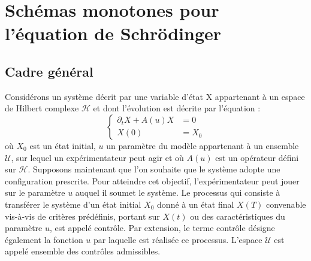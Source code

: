 \chapter{Schémas monotones pour l'équation de Schrödinger}

\section{Cadre général}
Considérons un système décrit par une variable d’état X appartenant à un espace de Hilbert complexe $\mathcal{H}$ et dont l’évolution est décrite par l'équation :
\begin{equation} \label{cadregeneral}
\begin{cases}
\partial_{t}X +A(u)X &= 0\\
X(0) &=X_0
\end{cases}
\end{equation}
où $X_0$ est un état initial, $u$ un paramètre du modèle appartenant à un ensemble $\mathcal{U}$, sur lequel un expérimentateur peut agir et où $A(u)$ est un opérateur défini sur $\mathcal{H}$. Supposons maintenant que l’on souhaite que le système adopte une configuration prescrite. Pour atteindre cet objectif, l’expérimentateur peut jouer sur le paramètre $u$ auquel il soumet le système. Le processus qui consiste à transférer le système d’un état initial $X_0$ donné à un état final $X(T)$ convenable vis-à-vis de critères prédéfinis, portant sur $X(t)$ ou des caractéristiques du paramètre $u$, est appelé contrôle. Par extension, le terme contrôle désigne également la fonction $u$ par laquelle est réalisée ce processus. L’espace $\mathcal{U}$ est appelé ensemble des contrôles admissibles.
